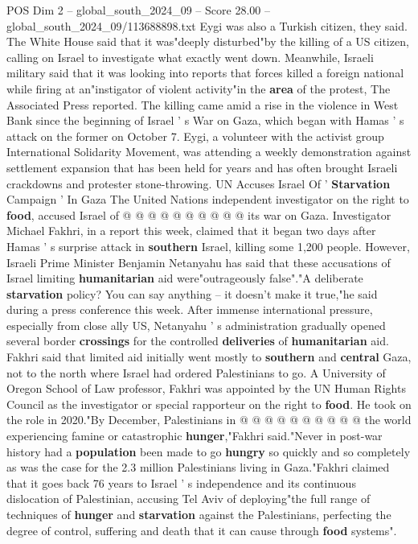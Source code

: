 \begin{textsample}{POS Dim 2 – global\_south\_2024\_09 – Score 28.00 – global\_south\_2024\_09/113688898.txt}
Eygi was also a Turkish citizen, they said.
The White House said that it was"deeply disturbed"by the killing of a US citizen, calling on Israel to investigate what exactly went down.
Meanwhile, Israeli military said that it was looking into reports that forces killed a foreign national while firing at an"instigator of violent activity"in the \textbf{area} of the protest, The Associated Press reported.
The killing came amid a rise in the violence in West Bank since the beginning of Israel ' s War on Gaza, which began with Hamas ' s attack on the former on October 7.
Eygi, a volunteer with the activist group International Solidarity Movement, was attending a weekly demonstration against settlement expansion that has been held for years and has often brought Israeli crackdowns and protester stone-throwing.
UN Accuses Israel Of ' \textbf{Starvation} Campaign ' In Gaza The United Nations independent investigator on the right to \textbf{food}, accused Israel of @ @ @ @ @ @ @ @ @ @ its war on Gaza.
Investigator Michael Fakhri, in a report this week, claimed that it began two days after Hamas ' s surprise attack in \textbf{southern} Israel, killing some 1,200 people.
However, Israeli Prime Minister Benjamin Netanyahu has said that these accusations of Israel limiting \textbf{humanitarian} aid were"outrageously false"."A deliberate \textbf{starvation} policy?
You can say anything -- it doesn't make it true,"he said during a press conference this week.
After immense international pressure, especially from close ally US, Netanyahu ' s administration gradually opened several border \textbf{crossings} for the controlled \textbf{deliveries} of \textbf{humanitarian} aid.
Fakhri said that limited aid initially went mostly to \textbf{southern} and \textbf{central} Gaza, not to the north where Israel had ordered Palestinians to go.
A University of Oregon School of Law professor, Fakhri was appointed by the UN Human Rights Council as the investigator or special rapporteur on the right to \textbf{food}.
He took on the role in 2020."By December, Palestinians in @ @ @ @ @ @ @ @ @ @ the world experiencing famine or catastrophic \textbf{hunger},"Fakhri said."Never in post-war history had a \textbf{population} been made to go \textbf{hungry} so quickly and so completely as was the case for the 2.3 million Palestinians living in Gaza."Fakhri claimed that it goes back 76 years to Israel ' s independence and its continuous dislocation of Palestinian, accusing Tel Aviv of deploying"the full range of techniques of \textbf{hunger} and \textbf{starvation} against the Palestinians, perfecting the degree of control, suffering and death that it can cause through \textbf{food} systems".

\end{textsample}
